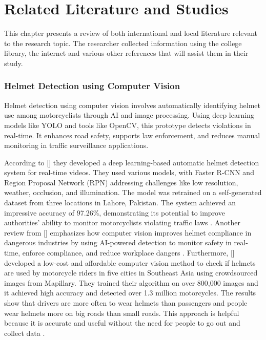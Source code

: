 
\chapter{Related Literature and Studies}

\begin{refsection}

    This chapter presents a review of both international and local literature relevant to the research topic. The researcher collected information using the college library, the internet and various other references that will assist them in their study.

\subsection{Helmet Detection using Computer Vision}
    Helmet detection using computer vision involves automatically identifying helmet use among motorcyclists through AI and image processing. Using deep learning models like YOLO and tools like OpenCV, this prototype detects violations in real-time. It enhances road safety, supports law enforcement, and reduces manual monitoring in traffic surveillance applications.

According to \citeauthor{afzal2021helmet} [\citeyear{afzal2021helmet}] they developed a deep learning-based automatic helmet detection system for real-time videos. They used various models, with Faster R-CNN and Region Proposal Network (RPN) addressing challenges like low resolution, weather, occlusion, and illumination. The model was retrained on a self-generated dataset from three locations in Lahore, Pakistan. The system achieved an impressive accuracy of 97.26\%, demonstrating its potential to improve authorities' ability to monitor motorcyclists violating traffic laws \cite{afzal2021helmet}. Another review from \citeauthor{singh2024visual} [\citeyear{singh2024visual}] emphasizes how computer vision improves helmet compliance in dangerous industries by using AI-powered detection to monitor safety in real-time, enforce compliance, and reduce workplace dangers \cite{singh2024visual}. Furthermore, \citeauthor{siebert2024urban} [\citeyear{siebert2024urban}] developed a low-cost and affordable computer vision method to check if helmets are used by motorcycle riders in five cities in Southeast Asia using crowdsourced images from Mapillary. They trained their algorithm on over 800,000 images and it achieved high accuracy and detected over 1.3 million motorcycles. The results show that drivers are more often to wear helmets than passengers and people wear helmets more on big roads than small roads. This approach is helpful because it is accurate and useful without the need for people to go out and collect data \cite{siebert2024urban}. 


\end{refsection}
